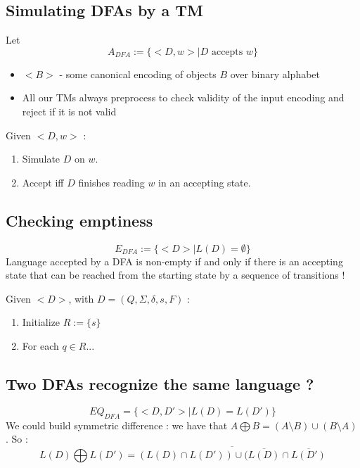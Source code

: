 \documentclass[12pt,a4paper]{article}
\newcommand{\<}{\langle}
\renewcommand{\>}{\rangle}
\begin{document}
\subsection{Simulating DFAs by a TM}
Let 
\[A_{DFA} := \Big\{\big< D, w\big> | D \text{ accepts } w \Big\}\]
\begin{itemize}
    \item $\big< B \big>$ - some canonical encoding of objects $B$ over binary alphabet
    \item All our TMs always preprocess to check validity of the input encoding and reject if it is not valid
\end{itemize}
Given $<D,w>$ :
\begin{enumerate}
    \item Simulate $D$ on $w$.
    \item Accept iff $D$ finishes reading $w$ in an accepting state.
\end{enumerate}

\subsection{Checking emptiness}
\[E_{DFA} := \big\{<D> | L(D) = \emptyset \big\}\]
Language accepted by a DFA is non-empty if and only if there is an accepting state that can be reached from the starting state by a sequence of transitions !

Given $<D>$, with $D = (Q,\Sigma, \delta, s, F)$ :
\begin{enumerate}
    \item Initialize $R := \{s\}$
    \item For each $q \in R...$
\end{enumerate}

\subsection{Two DFAs recognize the same language ?}
\[EQ_{DFA} = \big\{ <D, D'> | L(D) = L(D')\big\}\]
We could build symmetric difference : we have that $A \bigoplus B = (A \setminus B) \cup (B \setminus A)$. So :
\[L(D) \bigoplus L(D') = \overline{(L(D) \cap L(D')) \cup (\overline{L(D)} \cap \overline{L(D')}}\]
\end{document}
